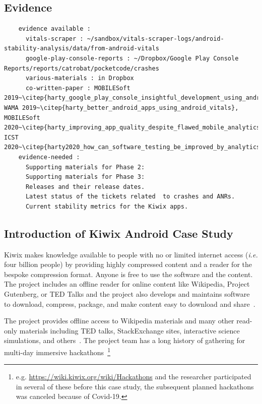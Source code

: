 \subsection*{Evidence}
  \begin{verbatim}
    evidence available :
      vitals-scraper : ~/sandbox/vitals-scraper-logs/android-stability-analysis/data/from-android-vitals
      google-play-console-reports : ~/Dropbox/Google Play Console Reports/reports/catrobat/pocketcode/crashes
      various-materials : in Dropbox
      co-written-paper : MOBILESoft 2019~\citep{harty_google_play_console_insightful_development_using_android_vitals_and_pre_launch_reports}, WAMA 2019~\citep{harty_better_android_apps_using_android_vitals}, MOBILESoft 2020~\citep{harty_improving_app_quality_despite_flawed_mobile_analytics}, ICST 2020~\citep{harty2020_how_can_software_testing_be_improved_by_analytics_to_deliver_better_apps}.
    evidence-needed : 
      Supporting materials for Phase 2:
      Supporting materials for Phase 3: 
      Releases and their release dates.
      Latest status of the tickets related  to crashes and ANRs.
      Current stability metrics for the Kiwix apps.
  \end{verbatim}

\subsection{Introduction of Kiwix Android Case Study}
Kiwix makes knowledge available to people with no or limited internet access (\emph{i.e.} four billion people) by providing highly compressed content and a reader for the bespoke compression format. Anyone is free to use the software and the content. The project includes an offline reader for online content like Wikipedia, Project Gutenberg, or TED Talks and the project also develops and maintains software to download, compress, package, and make content easy to download and share~\citep{kiwix_about_the_project, gomez2017_wikimedia_kiwix_article}.

The project provides offline access to Wikipedia materials and many other read-only materials including TED talks, StackExchange sites, interactive science simulations, and others~\citep{kiwix_about_the_project, gomez2017_wikimedia_kiwix_article}. The project team has a long history of gathering for multi-day immersive hackathons~\footnote{e.g. \url{https://wiki.kiwix.org/wiki/Hackathons} and the researcher participated in several of these before this case study, the subsequent planned hackathons was canceled because of Covid-19.}

